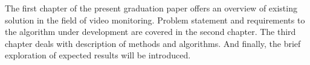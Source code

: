 \documentclass[12pt,a4paper,oneside,titlepage]{article}
\begin{document}
The first chapter of the present graduation paper offers an overview of existing solution in the field of video monitoring.
Problem statement and requirements to the algorithm under development are covered in the second chapter.
The third chapter deals with description of methods and algorithms.
And finally, the brief exploration of expected results will be introduced.
\end{document}
